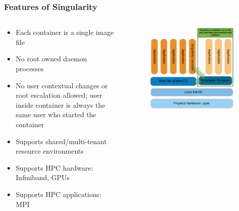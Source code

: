 \documentclass{beamer}
\begin{document}
\begin{frame}
   \frametitle{Features of Singularity}
   \begin{columns}
      \begin{column}{0.6\textwidth}
         \begin{itemize}
            \setlength\itemsep{1.0em}
            \item Each container is a single image file
            \item No root owned daemon processes
            \item No user contextual changes or root escalation allowed; 
               user inside container is always the same user who started 
               the container
            \item Supports shared/multi-tenant resource environments
            \item Supports HPC hardware: Infiniband, GPUs
            \item Supports HPC applications: MPI
         \end{itemize}
      \end{column}
      \hfill
      \begin{column}{0.5\textwidth}
         \begin{figure}[htbp]
            \includegraphics[width=1.0\textwidth]{images/singularity-container-architecture.png}
         \end{figure}
      \end{column}
   \end{columns}
\end{frame}
\end{document}
